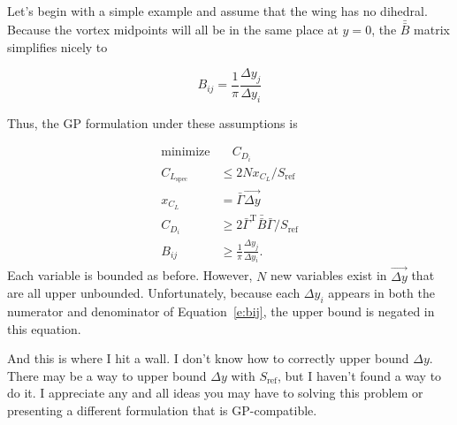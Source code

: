 \documentclass[10pt, a4paper]{article}
\begin{document}
Let's begin with a simple example and assume that the wing has no dihedral.  Because the vortex midpoints will all be in the same place at $y=0$, the $\bar{\bar{B}}$ matrix simplifies nicely to

\begin{equation}
    B_{ij} = \frac{1}{\pi} \frac{\Delta y_j}{\Delta y_i}
\end{equation}

Thus, the GP formulation under these assumptions is

\begin{align}
    \text{minimize} & \quad C_{D_i} \nonumber \\
    C_{L_{\mathrm{spec}}} &\leq 2 N x_{C_L}/S_{\mathrm{ref}} \\
    x_{C_L} &= \bar{\Gamma} \vec{\Delta y} \\
    C_{D_i} &\geq 2 \bar{\Gamma}^{\mathrm{T}} \bar{\bar{B}} \bar{\Gamma}/S_{\mathrm{ref}} \\
    \label{e:bij}
    B_{ij} &\geq \frac{1}{\pi} \frac{\Delta y_j}{\Delta y_i}.
\end{align}
Each variable is bounded as before.  However, $N$ new variables exist in $\vec{\Delta y}$ that are all upper unbounded.  Unfortunately, because each $\Delta y_i$ appears in both the numerator and denominator of Equation~\ref{e:bij}, the upper bound is negated in this equation. 

And this is where I hit a wall.  I don't know how to correctly upper bound $\Delta y$. There may be a way to upper bound $\Delta y$ with $S_{\mathrm{ref}}$, but I haven't found a way to do it.  I appreciate any and all ideas you may have to solving this problem or presenting a different formulation that is GP-compatible. 
\end{document}
